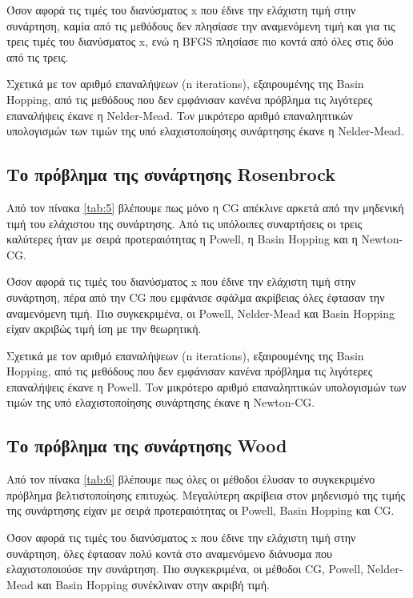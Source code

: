 \documentclass[a4paper,12pt,twoside]{report}
\theoremstyle{plain}
\theoremstyle{definition}
\theoremstyle{remark}
\begin{document}
Όσον αφορά τις τιμές του διανύσματος x που έδινε την ελάχιστη τιμή στην συνάρτηση, καμία από τις μεθόδους δεν πλησίασε την αναμενόμενη τιμή και για τις τρεις τιμές του διανύσματος x, ενώ η BFGS πλησίασε πιο κοντά από όλες στις δύο από τις τρεις.

Σχετικά με τον αριθμό επαναλήψεων (n iterations), εξαιρουμένης της Basin Hopping, από τις μεθόδους που δεν εμφάνισαν κανένα πρόβλημα τις λιγότερες επαναλήψεις έκανε η Nelder-Mead. Toν μικρότερο αριθμό επαναληπτικών υπολογισμών των τιμών της υπό ελαχιστοποίησης συνάρτησης έκανε η Nelder-Mead.

\subsection{Το πρόβλημα της συνάρτησης Rosenbrock}

Από τον πίνακα \ref{tab:5} βλέπουμε πως μόνο η CG απέκλινε αρκετά από την μηδενική τιμή του ελάχιστου της συνάρτησης. Από τις υπόλοιπες συναρτήσεις οι τρεις καλύτερες ήταν με σειρά προτεραιότητας η Powell, η Basin Hopping και η Newton-CG.

Όσον αφορά τις τιμές του διανύσματος x που έδινε την ελάχιστη τιμή στην συνάρτηση, πέρα από την CG που εμφάνισε σφάλμα ακρίβειας όλες έφτασαν την αναμενόμενη τιμή. Πιο συγκεκριμένα, οι Powell, Nelder-Mead και Basin Hopping είχαν ακριβώς τιμή ίση με την θεωρητική.

Σχετικά με τον αριθμό επαναλήψεων (n iterations), εξαιρουμένης της Basin Hopping,  από τις μεθόδους που δεν εμφάνισαν κανένα πρόβλημα τις λιγότερες επαναλήψεις έκανε η Powell. Toν μικρότερο αριθμό επαναληπτικών υπολογισμών των τιμών της υπό ελαχιστοποίησης συνάρτησης έκανε η Newton-CG.

\subsection{Το πρόβλημα της συνάρτησης Wood}

Από τον πίνακα \ref{tab:6} βλέπουμε πως όλες οι μέθοδοι έλυσαν το συγκεκριμένο πρόβλημα βελτιστοποίησης επιτυχώς. Μεγαλύτερη ακρίβεια στον μηδενισμό της τιμής της συνάρτησης είχαν με σειρά προτεραιότητας οι Powell, Basin Hopping και CG.

Όσον αφορά τις τιμές του διανύσματος x που έδινε την ελάχιστη τιμή στην συνάρτηση, όλες έφτασαν πολύ κοντά στο αναμενόμενο διάνυσμα που ελαχιστοποιούσε την συνάρτηση. Πιο συγκεκριμένα, οι μέθοδοι CG, Powell, Nelder-Mead και Basin Hopping συνέκλιναν στην ακριβή τιμή.
\end{document}

